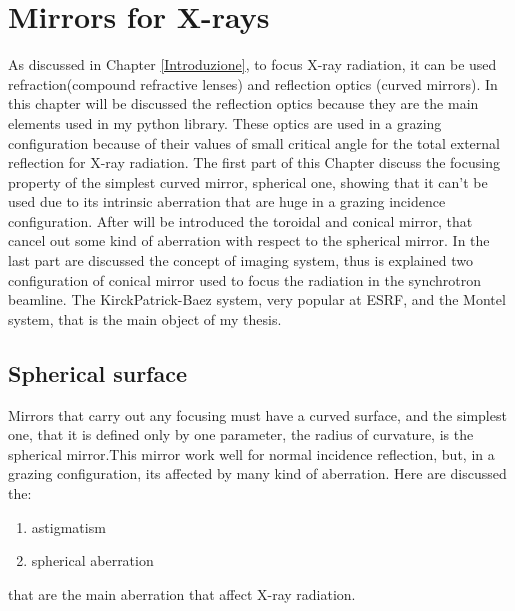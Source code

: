 \chapter{Mirrors for X-rays}
\label{capitolo2}
\thispagestyle{empty}
\vspace{0.5cm}

\noindent As discussed in Chapter \ref{Introduzione}, to focus X-ray radiation, it can be used refraction(compound refractive lenses) and reflection optics (curved mirrors). In this chapter will be discussed the reflection optics because they are the main elements used in my python library. These optics are used in a grazing configuration because of their values of small critical angle for the total external reflection for X-ray radiation. The first part of this Chapter discuss the focusing property of the simplest curved mirror, spherical one, showing that it can't be used due to its intrinsic aberration that are huge in a grazing incidence configuration. After will be introduced the toroidal and conical mirror, that cancel out some kind of aberration with respect to the spherical mirror. In the last part are discussed the concept of imaging system, thus is explained two configuration of conical mirror used to focus the radiation in the synchrotron beamline. The KirckPatrick-Baez system, very popular at ESRF, and the Montel system, that is the main object of my thesis.

\section{Spherical surface}
\noindent Mirrors that carry out any focusing must have a curved surface, and the simplest one, that it is defined only by one parameter, the radius of curvature, is the spherical mirror.This mirror work well for normal incidence reflection, but, in a grazing configuration, its affected by many kind of aberration. Here are discussed the:
\begin{enumerate}
\item astigmatism
\item spherical aberration
\end{enumerate}
that are the main aberration that affect X-ray radiation.
